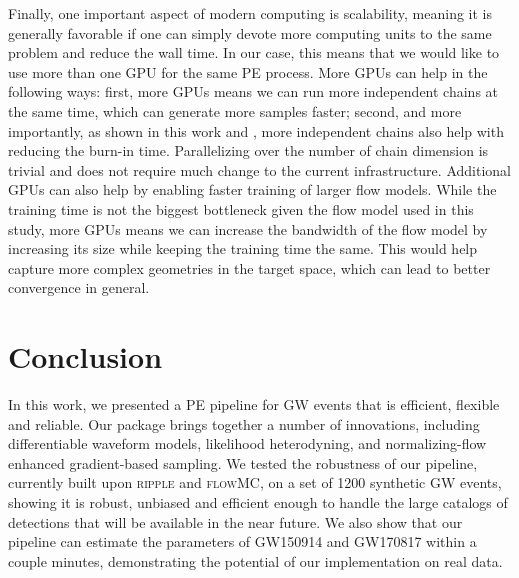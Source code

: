 \documentclass[twocolumn]{aastex631}
\begin{document}
Finally, one important aspect of modern computing is scalability, meaning it is
generally favorable if one can simply devote more computing units to the same
problem and reduce the wall time. In our case, this means that we would like to
use more than one GPU for the same PE process. More GPUs can help in the
following ways: first, more GPUs means we can run more independent chains at
the same time, which can generate more samples faster; second, and more
importantly, as shown in this work and \cite{2022arXiv221106397W}, more independent
chains also help with reducing the burn-in time. Parallelizing over the number
of chain dimension is trivial and does not require much change to the current
infrastructure. Additional GPUs can also help by enabling faster training of
larger flow models. While the training time is not the biggest bottleneck given
the flow model used in this study, more GPUs means we can increase the
bandwidth of the flow model by increasing its size while keeping the training
time the same. This would help capture more complex geometries in the target
space, which can lead to better convergence in general.

\section{Conclusion}

In this work, we presented a PE pipeline for GW events that is efficient,
flexible and reliable. Our package brings together a number of innovations,
including differentiable waveform models, likelihood heterodyning, and
normalizing-flow enhanced gradient-based sampling. We tested the robustness of
our pipeline, currently built upon \textsc{ripple} and \textsc{flowMC}, on a
set of 1200 synthetic GW events, showing it is robust, unbiased and efficient
enough to handle the large catalogs of detections that will be available in the
near future. We also show that our pipeline can estimate the parameters of
GW150914 and GW170817 within a couple minutes, demonstrating the potential of our
implementation on real data.
\end{document}
